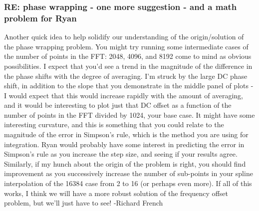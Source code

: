 \documentclass[crop=false,class=article,oneside]{standalone}
\begin{document}
\subsubsection{\footnotesize RE: phase wrapping - one more suggestion - and a math problem for Ryan}
Another quick idea to help solidify our understanding of the origin/solution of the phase wrapping problem. You might try running some intermediate cases of the number of points in the FFT: 2048, 4096, and 8192 come to mind as obvious possibilities. I expect that you'd see a trend in the magnitude of the difference in the phase shifts with the degree of averaging. I'm struck by the large DC phase shift, in addition to the slope that you demonstrate in the middle panel of plots - I would expect that this would increase rapidly with the amount of averaging, and it would be interesting to plot just that DC offset as a function of the number of points in the FFT divided by 1024, your base case. It might have some interesting curvature, and this is something that you could relate to the magnitude of the error in Simpson's rule, which is the method you are using for integration. Ryan would probably have some interest in predicting the error in Simpson's rule as you increase the step size, and seeing if your results agree. Similarly, if my hunch about the origin of the problem is right, you should find improvement as you successively increase the number of sub-points in your spline interpolation of the 16384 case from 2 to 16 (or perhaps even more). If all of this works, I think we will have a more robust solution of the frequency offset problem, but we'll just have to see! -Richard French
\end{document}
